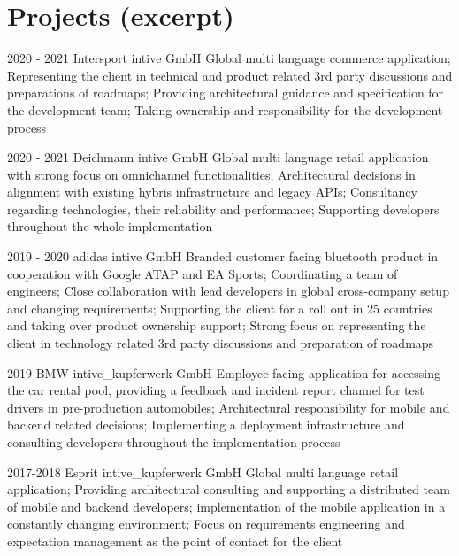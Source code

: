 \documentclass[]{friggeri-cv} %
\begin{document}
\section{Projects (excerpt)}

\begin{entrylist}
	
	\entry
	{2020 - 2021}
	{Intersport}
	{intive GmbH}
	{Global multi language commerce application; Representing the client in technical and product related 3rd party discussions and preparations of roadmaps; Providing architectural guidance and specification for the development team; Taking ownership and responsibility for the development process}
	
	
	\entry
	{2020 - 2021}
	{Deichmann}
	{intive GmbH}
	{Global multi language retail application with strong focus on omnichannel functionalities; Architectural decisions in alignment with existing hybris infrastructure and legacy APIs; Consultancy regarding technologies, their reliability and performance; Supporting developers throughout the whole implementation}

	
	\entry
	{2019 - 2020}
	{adidas}
	{intive GmbH}
	{Branded customer facing bluetooth product in cooperation with Google ATAP and EA Sports; Coordinating a team of engineers; Close collaboration with lead developers in global cross-company setup and changing requirements; Supporting the client for a roll out in 25 countries and taking over product ownership support; Strong focus on representing the client in technology related 3rd party discussions and preparation of roadmaps}
	
	
	
	\entry
	{2019}
	{BMW}
	{intive\_kupferwerk GmbH}
	{Employee facing application for accessing the car rental pool, providing a feedback and incident report channel for test drivers in pre-production automobiles; Architectural responsibility for mobile and backend related decisions; Implementing a deployment infrastructure and consulting developers throughout the implementation process}
	
	
	\entry
	{2017-2018}
	{Esprit}
	{intive\_kupferwerk GmbH}
	{Global multi language retail application; Providing architectural consulting and supporting a distributed team of mobile and backend developers; implementation of the mobile application in a constantly changing environment; Focus on requirements engineering and expectation management as the point of contact for the client}
	

\end{entrylist}
\end{document}
